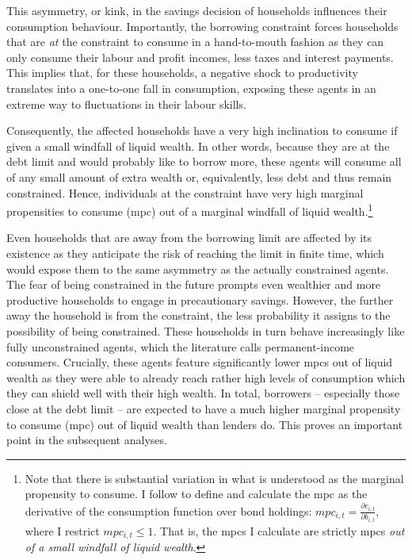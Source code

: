 \documentclass[a4paper,12pt]{article} %
\numberwithin{equation}{section} %
\numberwithin{figure}{section}
\numberwithin{table}{section}
\begin{document}

This asymmetry, or kink, in the savings decision of households influences their consumption behaviour. Importantly, the borrowing constraint forces households that are \textit{at} the constraint to consume in a hand-to-mouth fashion as they can only consume their labour and profit incomes, less taxes and interest payments. This implies that, for these households, a negative shock to productivity translates into a one-to-one fall in consumption, exposing these agents in an extreme way to fluctuations in their labour skills. 

Consequently, the affected households have a very high inclination to consume if given a small windfall of liquid wealth. In other words, because they are at the debt limit and would probably like to borrow more, these agents will consume all of any small amount of extra wealth or, equivalently, less debt and thus remain constrained. Hence, individuals at the constraint have very high marginal propensities to consume (\Gls{mpc}) out of a marginal windfall of liquid wealth.\footnote{Note that there is substantial variation in what is understood as the marginal propensity to consume. I follow \textcite{gl2017} to define and calculate the \Gls{mpc} as the derivative of the consumption function over bond holdings: $mpc_{i,t} = \frac{\partial c_{i,t}}{\partial b_{i,t}}$, where I restrict $mpc_{i,t} \le 1$. That is, the \Gls{mpc}s I calculate are strictly \Gls{mpc}s \textit{out of a small windfall of liquid wealth}.} %

Even households that are away from the borrowing limit are affected by its existence as they anticipate the risk of reaching the limit in finite time, which would expose them to the same asymmetry as the actually constrained agents. The fear of being constrained in the future prompts even wealthier and more productive households to engage in precautionary savings. However, the further away the household is from the constraint, the less probability it assigns to the possibility of being constrained. These households in turn behave increasingly like fully unconstrained agents, which the literature calls permanent-income consumers. Crucially, these agents feature significantly lower \Gls{mpc}s out of liquid wealth as they were able to already reach rather high levels of consumption which they can shield well with their high wealth. In total, borrowers -- especially those close at the debt limit -- are expected to have a much higher marginal propensity to consume (\Gls{mpc}) out of liquid wealth than lenders do. This proves an important point in the subsequent analyses.
\end{document}
